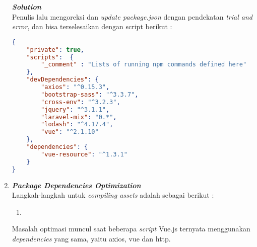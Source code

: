 \begin{enumerate}
  \textbf{\textit{Solution}} \\
    \indentenum Penulis lalu mengoreksi dan \textit{update package.json} dengan pendekatan \textit{trial and error}, dan bisa terselesaikan dengan script berikut :
		  	
\begin{lstlisting}[language=json]
{
	"private": true,
	"scripts": 	{
		"_comment" : "Lists of running npm commands defined here"
	},
	"devDependencies": {
		"axios": "^0.15.3",
		"bootstrap-sass": "^3.3.7",
		"cross-env": "^3.2.3",
		"jquery": "^3.1.1",
		"laravel-mix": "0.*",
		"lodash": "^4.17.4",
		"vue": "^2.1.10"
	},
	"dependencies": {
		"vue-resource": "^1.3.1"
	}
}
 	\end{lstlisting}
			  	
			  
\item \textbf{\textit{Package Dependencies Optimization}}
		\\ \indent
		Langkah-langkah untuk \textit{compiling assets} adalah sebagai berikut :
		\begin{enumerate}
			\item 
		\end{enumerate}
		Masalah optimasi muncul saat beberapa \textit{script} Vue.js ternyata menggunakan \textit{dependencies} yang sama, yaitu axios, vue dan http.
		\\ \indentenum
	 \end{enumerate}
